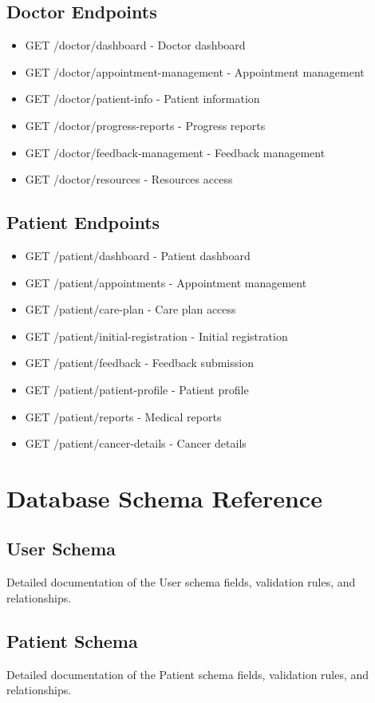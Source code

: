 \documentclass[12pt,a4paper]{report}
\begin{document}
\section{Doctor Endpoints}
\begin{itemize}
    \item GET /doctor/dashboard - Doctor dashboard
    \item GET /doctor/appointment-management - Appointment management
    \item GET /doctor/patient-info - Patient information
    \item GET /doctor/progress-reports - Progress reports
    \item GET /doctor/feedback-management - Feedback management
    \item GET /doctor/resources - Resources access
\end{itemize}

\section{Patient Endpoints}
\begin{itemize}
    \item GET /patient/dashboard - Patient dashboard
    \item GET /patient/appointments - Appointment management
    \item GET /patient/care-plan - Care plan access
    \item GET /patient/initial-registration - Initial registration
    \item GET /patient/feedback - Feedback submission
    \item GET /patient/patient-profile - Patient profile
    \item GET /patient/reports - Medical reports
    \item GET /patient/cancer-details - Cancer details
\end{itemize}

\chapter{Database Schema Reference}

\section{User Schema}
Detailed documentation of the User schema fields, validation rules, and relationships.

\section{Patient Schema}
Detailed documentation of the Patient schema fields, validation rules, and relationships.
\end{document}
